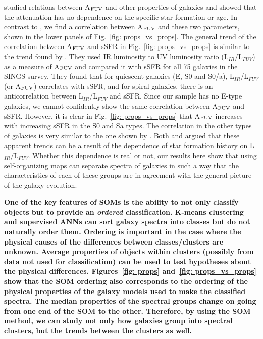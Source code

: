          studied relations between A$_{\rm {FUV}}$ and other properties of galaxies and showed that the attenuation has no dependence on the specific star formation or age.
        In contrast to , we find a correlation between A$_{\rm {FUV}}$ and these two parameters, shown in the lower panels of Fig.~\ref{fig: props_vs_props}.
        The general trend of the correlation between A$_{\rm {FUV}}$ and sSFR in Fig.~\ref{fig: props_vs_props} is similar to the trend found by \cite{Dale07}.
        They used IR luminosity to UV luminosity ratio (L$_{IR}$/L$_{FUV}$) as a measure of A$_{\rm {FUV}}$ and compared it with sSFR for all 75 galaxies in the SINGS survey.
        They found that for quiescent galaxies (E, S0 and S0/a), L$_{IR}$/L$_{FUV}$ (or A$_{\rm {FUV}}$) correlates with sSFR, and for spiral galaxies, there is an anticorrelation between L$_{IR}$/L$_{FUV}$ and sSFR.
        Since our sample has no E-type galaxies, we cannot confidently show the same correlation between A$_{\rm {FUV}}$ and sSFR. 
        However, it is clear in Fig.~\ref{fig: props_vs_props} that A$_{\rm {FUV}}$ increases with increasing sSFR in the S0 and Sa types.
        The correlation in the other types of galaxies is very similar to the one shown by \cite{Dale07}.
        Both \cite{Dale07} and  argued that these apparent trends can be a result of the dependence of star formation history on L$_{IR}$/L$_{FUV}$.
        Whether this dependence is real or not, our results here show that using self-organizing maps can separate spectra of galaxies in such a way that the characteristics of each of these groups are in agreement with the general picture of the galaxy evolution.
          
       \textbf{One of the key features of SOMs is the ability to not only classify objects but to provide an {\em ordered} classification.
       K-means clustering and supervised ANNs can sort galaxy spectra into classes but do not naturally order them. Ordering is important in the case where the physical causes of the differences between classes/clusters are unknown. Average properties of objects within clusters (possibly from data not used for classification) can be used to test hypotheses about the physical differences. 
       Figures~\ref{fig: props} and~\ref{fig: props_vs_props} show that the SOM ordering also corresponds to the ordering of the physical properties of the galaxy models used to make the classified spectra. 
       The median properties of the spectral groups change on going from one end of the SOM to the other.
       Therefore, by using the SOM method, we can study not only how galaxies group into spectral clusters, but the trends between the clusters as well.}

